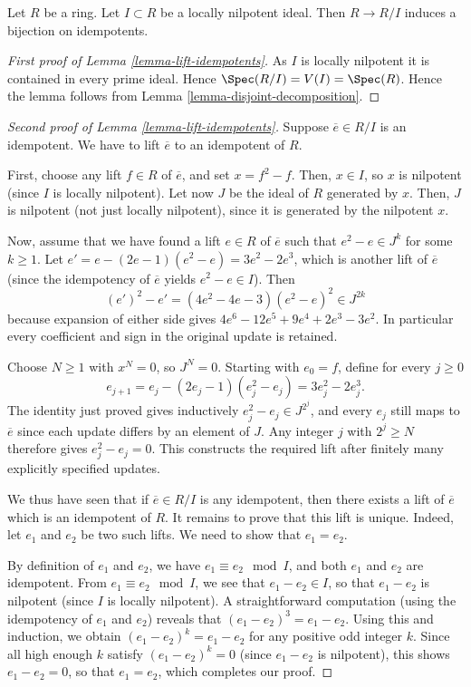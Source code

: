 \begin{lemma}
\label{lemma-lift-idempotents}
Let $R$ be a ring. Let $I \subset R$ be a locally nilpotent ideal.
Then $R \to R/I$ induces a bijection on idempotents.
\end{lemma}

\begin{proof}[First proof of Lemma \ref{lemma-lift-idempotents}]
As $I$ is locally nilpotent it is contained in every prime ideal.
Hence $\Spec(R/I) = V(I) = \Spec(R)$. Hence the
lemma follows from Lemma \ref{lemma-disjoint-decomposition}.
\end{proof}

\begin{proof}[Second proof of Lemma \ref{lemma-lift-idempotents}]
Suppose $\overline{e} \in R/I$ is an idempotent.
We have to lift $\overline{e}$ to an idempotent of $R$.

\medskip\noindent
First, choose any lift $f \in R$ of $\overline{e}$, and set
$x = f^2 - f$. Then, $x \in I$, so $x$ is nilpotent (since $I$
is locally nilpotent). Let now $J$ be the ideal of $R$ generated
by $x$. Then, $J$ is nilpotent (not just locally nilpotent),
since it is generated by the nilpotent $x$.

\medskip\noindent
Now, assume that we have found a lift $e \in R$ of $\overline{e}$
such that $e^2 - e \in J^k$ for some $k \geq 1$.
Let $e' = e - (2e - 1)(e^2 - e) = 3e^2 - 2e^3$, which is another
lift of $\overline{e}$ (since the idempotency of $\overline{e}$
yields $e^2 - e \in I$). Then
$$
(e')^2 - e' = (4e^2 - 4e - 3)(e^2 - e)^2 \in J^{2k}
$$
because expansion of either side gives
$4e^6-12e^5+9e^4+2e^3-3e^2$.
In particular every coefficient and sign in the original update is retained.

\medskip\noindent
Choose $N\geq1$ with $x^N=0$, so $J^N=0$.
Starting with $e_0=f$, define for every $j\geq0$
$$
e_{j+1}=e_j-(2e_j-1)(e_j^2-e_j)=3e_j^2-2e_j^3.
$$
The identity just proved gives inductively
$e_j^2-e_j\in J^{2^j}$, and every $e_j$ still maps to
$\overline e$ since each update differs by an element of $J$.
Any integer $j$ with $2^j\geq N$ therefore gives
$e_j^2-e_j=0$. This constructs the required lift after finitely
many explicitly specified updates.

\medskip\noindent
We thus have seen that if $\overline{e} \in R/I$ is any
idempotent, then there exists a lift of $\overline{e}$
which is an idempotent of $R$.
It remains to prove that this lift is unique. Indeed, let
$e_1$ and $e_2$ be two such lifts. We
need to show that $e_1 = e_2$.

\medskip\noindent
By definition of $e_1$ and $e_2$, we have $e_1 \equiv e_2
\mod I$, and both $e_1$ and $e_2$ are idempotent. From
$e_1 \equiv e_2 \mod I$, we see that $e_1 - e_2 \in I$,
so that $e_1 - e_2$ is nilpotent (since $I$ is locally nilpotent).
A straightforward
computation (using the idempotency of $e_1$ and $e_2$)
reveals that $(e_1 - e_2)^3 = e_1 - e_2$. Using this and
induction, we obtain $(e_1 - e_2)^k = e_1 - e_2$ for any
positive odd integer $k$. Since all high enough $k$ satisfy
$(e_1 - e_2)^k = 0$ (since $e_1 - e_2$ is nilpotent),
this shows $e_1 - e_2 = 0$, so that $e_1 = e_2$, which
completes our proof.
\end{proof}